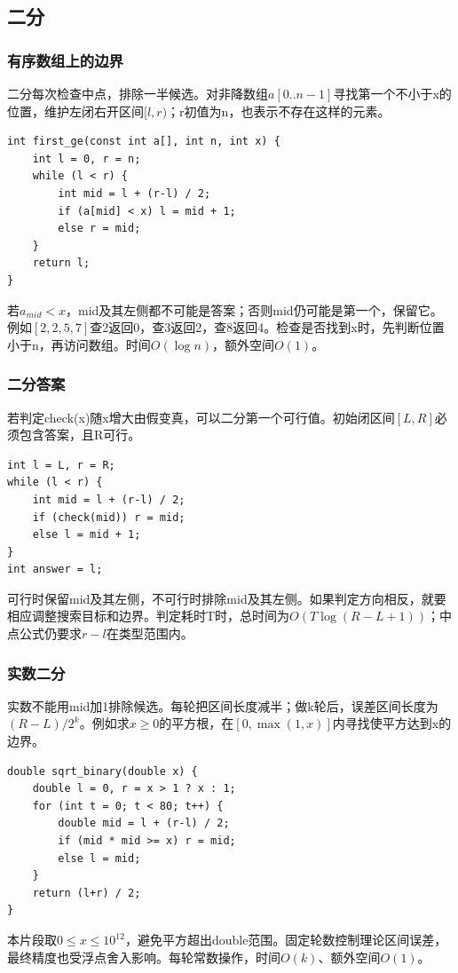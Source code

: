 \subsection{二分}
\subsubsection{有序数组上的边界}
二分每次检查中点，排除一半候选。对非降数组$a[0..n-1]$寻找第一个不小于x的位置，维护左闭右开区间$[l,r)$；r初值为n，也表示不存在这样的元素。
\begin{lstlisting}
int first_ge(const int a[], int n, int x) {
    int l = 0, r = n;
    while (l < r) {
        int mid = l + (r-l) / 2;
        if (a[mid] < x) l = mid + 1;
        else r = mid;
    }
    return l;
}
\end{lstlisting}
若$a_{mid}<x$，mid及其左侧都不可能是答案；否则mid仍可能是第一个，保留它。例如$[2,2,5,7]$查2返回0，查3返回2，查8返回4。检查是否找到x时，先判断位置小于n，再访问数组。时间$O(\log n)$，额外空间$O(1)$。

\subsubsection{二分答案}
若判定check(x)随x增大由假变真，可以二分第一个可行值。初始闭区间$[L,R]$必须包含答案，且R可行。
\begin{lstlisting}
int l = L, r = R;
while (l < r) {
    int mid = l + (r-l) / 2;
    if (check(mid)) r = mid;
    else l = mid + 1;
}
int answer = l;
\end{lstlisting}
可行时保留mid及其左侧，不可行时排除mid及其左侧。如果判定方向相反，就要相应调整搜索目标和边界。判定耗时T时，总时间为$O(T\log(R-L+1))$；中点公式仍要求$r-l$在类型范围内。

\subsubsection{实数二分}
实数不能用mid加1排除候选。每轮把区间长度减半；做k轮后，误差区间长度为$(R-L)/2^k$。例如求$x\ge0$的平方根，在$[0,\max(1,x)]$内寻找使平方达到x的边界。
\begin{lstlisting}
double sqrt_binary(double x) {
    double l = 0, r = x > 1 ? x : 1;
    for (int t = 0; t < 80; t++) {
        double mid = l + (r-l) / 2;
        if (mid * mid >= x) r = mid;
        else l = mid;
    }
    return (l+r) / 2;
}
\end{lstlisting}
本片段取$0\le x\le10^{12}$，避免平方超出double范围。固定轮数控制理论区间误差，最终精度也受浮点舍入影响。每轮常数操作，时间$O(k)$、额外空间$O(1)$。

